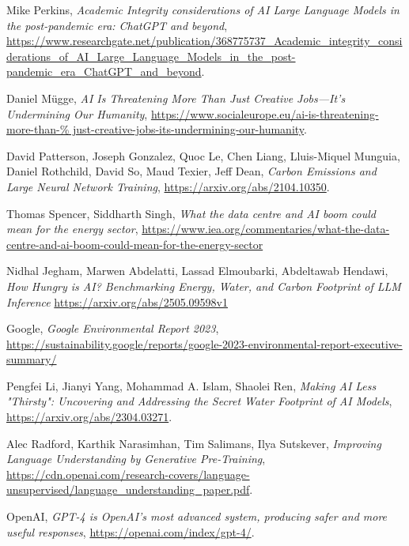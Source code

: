 \begin{thebibliography}{9}

	Mike Perkins,
	\textit{Academic Integrity considerations of AI Large Language Models in the post-pandemic era: ChatGPT and beyond},
	\url{https://www.researchgate.net/publication/368775737_Academic_integrity_considerations_of_AI_Large_Language_Models_in_the_post-pandemic_era_ChatGPT_and_beyond}.

	Daniel Mügge,
	\textit{AI Is Threatening More Than Just Creative Jobs—It’s Undermining Our Humanity},
	\url{https://www.socialeurope.eu/ai-is-threatening-more-than-%
	just-creative-jobs-its-undermining-our-humanity}.

	David Patterson, Joseph Gonzalez, Quoc Le, Chen Liang, Lluis-Miquel Munguia, Daniel Rothchild, David So, Maud Texier, Jeff Dean,
	\textit{Carbon Emissions and Large Neural Network Training},
	\url{https://arxiv.org/abs/2104.10350}.

	Thomas Spencer, Siddharth Singh,
	\textit{What the data centre and AI boom could mean for the energy sector},
	\url{https://www.iea.org/commentaries/what-the-data-centre-and-ai-boom-could-mean-for-the-energy-sector}

	Nidhal Jegham, Marwen Abdelatti, Lassad Elmoubarki, Abdeltawab Hendawi,
	\textit{How Hungry is AI? Benchmarking Energy, Water, and Carbon Footprint of LLM Inference}
	\url{https://arxiv.org/abs/2505.09598v1}

	Google,
	\textit{Google Environmental Report 2023},
	\url{https://sustainability.google/reports/google-2023-environmental-report-executive-summary/}

	Pengfei Li, Jianyi Yang, Mohammad A. Islam, Shaolei Ren,
	\textit{Making AI Less "Thirsty": Uncovering and Addressing the Secret Water Footprint of AI Models},
	\url{https://arxiv.org/abs/2304.03271}.

	Alec Radford, Karthik Narasimhan, Tim Salimans, Ilya Sutskever,
	\textit{Improving Language Understanding by Generative Pre-Training},
	\url{https://cdn.openai.com/research-covers/language-unsupervised/language_understanding_paper.pdf}.

	OpenAI,
	\textit{GPT-4 is OpenAI’s most advanced system, producing safer and more useful responses},
	\url{https://openai.com/index/gpt-4/}.


\end{thebibliography}
